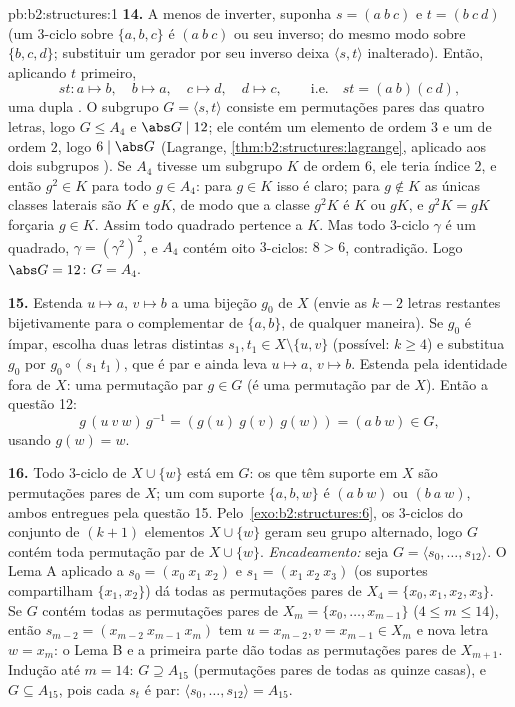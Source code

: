 \begin{solution}{pb:b2:structures:1}
\textbf{14.} A menos de inverter, suponha $s = (a\ b\ c)$ e $t =
(b\ c\ d)$ (um $3$-ciclo sobre $\{a,b,c\}$ é $(a\ b\ c)$ ou seu
inverso; do mesmo modo sobre $\{b,c,d\}$; substituir um gerador por seu
inverso deixa $\langle s, t\rangle$ inalterado). Então, aplicando
$t$ primeiro,
\[
st \colon a \mapsto b,\quad b \mapsto a,\quad c \mapsto d,\quad
d \mapsto c, \qquad\text{i.e.}\quad st = (a\ b)(c\ d),
\]
uma dupla . O subgrupo $G = \langle s, t\rangle$
consiste em permutações pares das quatro letras, logo $G \leq
A_4$ e $\abs G \mid 12$; ele contém um elemento de ordem $3$
e um de ordem $2$, logo $6 \mid \abs G$ (Lagrange,
\cref{thm:b2:structures:lagrange}, aplicado aos dois subgrupos
). Se $A_4$ tivesse um subgrupo $K$ de ordem $6$, ele teria
índice $2$, e então $g^2 \in K$ para todo $g \in A_4$: para
$g \in K$ isso é claro; para $g \notin K$ as únicas classes laterais são
$K$ e $gK$, de modo que a classe $g^2K$ é $K$ ou $gK$, e $g^2K =
gK$ forçaria $g \in K$. Assim todo quadrado pertence a $K$. Mas todo
$3$-ciclo $\gamma$ é um quadrado, $\gamma = (\gamma^2)^2$, e
$A_4$ contém oito $3$-ciclos: $8 > 6$, contradição. Logo
$\abs G = 12$: $G = A_4$.

\textbf{15.} Estenda $u \mapsto a$, $v \mapsto b$ a uma bijeção
$g_0$ de $X$ (envie as $k - 2$ letras restantes bijetivamente
para o complementar de $\{a, b\}$, de qualquer maneira). Se $g_0$ é ímpar,
escolha duas letras distintas $s_1, t_1 \in X \setminus \{u, v\}$
(possível: $k \geq 4$) e substitua $g_0$ por $g_0 \circ (s_1\
t_1)$, que é par e ainda leva $u \mapsto a$, $v \mapsto
b$. Estenda pela identidade fora de $X$: uma permutação par $g \in
G$ (é uma permutação par de $X$). Então a questão 12:
\[
g\,(u\ v\ w)\,g^{-1} = (g(u)\ g(v)\ g(w)) = (a\ b\ w) \in G,
\]
usando $g(w) = w$.

\textbf{16.} Todo $3$-ciclo de $X \cup \{w\}$ está em $G$:
os que têm suporte em $X$ são permutações pares de $X$; um com
suporte $\{a, b, w\}$ é $(a\ b\ w)$ ou $(b\ a\ w)$, ambos
entregues pela questão 15. Pelo~\cref{exo:b2:structures:6}, os
$3$-ciclos do conjunto de $(k+1)$ elementos $X \cup \{w\}$ geram
seu grupo alternado, logo $G$ contém toda permutação par de
$X \cup \{w\}$. \emph{Encadeamento:} seja $G = \langle s_0, \dots,
s_{12}\rangle$. O Lema A aplicado a $s_0 = (x_0\ x_1\ x_2)$ e
$s_1 = (x_1\ x_2\ x_3)$ (os suportes compartilham $\{x_1, x_2\}$) dá
todas as permutações pares de $X_4 = \{x_0, x_1, x_2, x_3\}$. Se $G$
contém todas as permutações pares de $X_m = \{x_0, \dots,
x_{m-1}\}$ ($4 \leq m \leq 14$), então $s_{m-2} = (x_{m-2}\
x_{m-1}\ x_m)$ tem $u = x_{m-2}, v = x_{m-1} \in X_m$ e nova
letra $w = x_m$: o Lema B e a primeira parte dão todas as permutações
pares de $X_{m+1}$. Indução até $m = 14$: $G \supseteq
A_{15}$ (permutações pares de todas as quinze casas), e $G
\subseteq A_{15}$, pois cada $s_t$ é par: $\langle s_0, \dots,
s_{12}\rangle = A_{15}$.


\end{solution}
